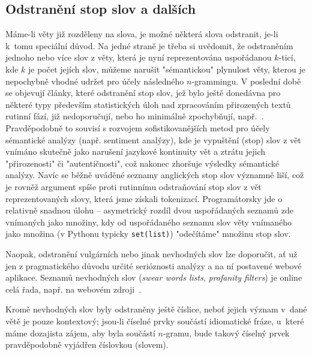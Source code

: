 \subsection{Odstranění stop slov a dalších}

Máme-li věty již rozděleny na slova, je možné některá slova odstranit,
je-li k~tomu speciální důvod. Na jedné straně je třeba si uvědomit,
že odstraněním jednoho nebo více slov z věty, která je nyní reprezentována
uspořádanou $k$-ticí, kde $k$ je počet jejích slov, můžeme narušit
"sémantickou" plynulost věty, kterou je nepochybně vhodné udržet pro účely
následného $n$-grammingu. V poslední době se objevují články, které
odstranění stop slov, jež bylo ještě donedávna pro některé typy
především statistických úloh nad zpracováním přirozených textů rutinní
fází, již nedoporučují, nebo ho minimálně zpochybňují, např.~\cite{Saif2014}.
Pravděpodobně to souvisí s rozvojem sofistikovanějších metod pro účely
sémantické analýzy (např. sentiment analýzy), kde je vypuštění
(stop) slov z vět vnímáno skutečně jako narušení jazykové kontinuity
vět a ztrátu jejich "přirozenosti" či "autentičnosti", což nakonec
zhoršuje výsledky sémantické analýzy. Navíc se běžně uváděné seznamy
anglických stop slov významně liší, což je rovněž argument spíše proti
rutinnímu odstraňování stop slov z vět reprezentovaných slovy, která jsme
získali tokenizací. Programátorsky jde o relativně snadnou úlohu
-- asymetrický rozdíl dvou uspořádaných seznamů zde vnímaných jako množiny,
kdy od uspořádaného seznamu slov věty vnímaného jako množina
(v Pythonu typicky \texttt{set(list)}) "odečítáme" množinu stop slov.

Naopak, odstranění vulgárních nebo jinak nevhodných slov%
 lze doporučit, ať
už jen z pragmatického důvodu určité serióznosti analýzy a na ní postavené
webové aplikace.
Seznamů nevhodných slov (\textit{swear words lists},
\textit{profanity filters}) je online celá řada, např. na webovém zdroji~\cite{SwearWordsLink}.

Kromě nevhodných slov byly odstraněny ještě číslice, neboť jejich význam
v~dané větě je pouze kontextový; jsou-li číselné prvky součástí idiomatické
fráze, u~které máme dozajista zájem, aby byla součástí $n$-gramu, bude takový
číselný prvek pravděpodobně vyjádřen číslovkou (slovem).


